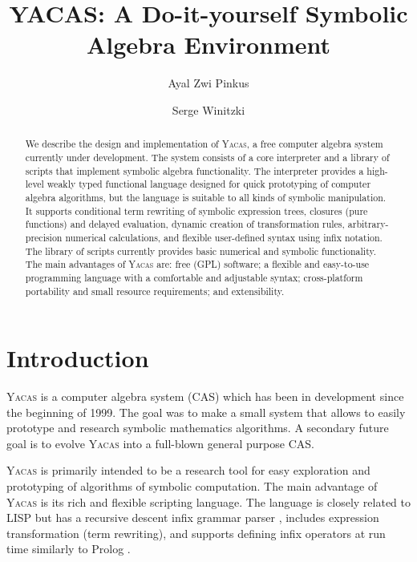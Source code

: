 \documentclass{llncs}
\begin{document}
\title{YACAS: A Do-it-yourself Symbolic Algebra Environment}

\author{Ayal Zwi Pinkus \and Serge Winitzki}

\maketitle

\begin{abstract}
We describe the design and implementation of \textsc{Yacas}, a free computer
algebra system currently under development.  The system consists of a core
interpreter and a library of scripts that implement symbolic algebra
functionality.  The interpreter provides a high-level weakly typed functional
language designed for quick prototyping of computer algebra algorithms, but the
language is suitable to all kinds of symbolic manipulation. It supports
conditional term rewriting of symbolic expression trees, closures (pure
functions) and delayed evaluation, dynamic creation of transformation rules,
arbitrary-precision numerical calculations, and flexible user-defined syntax
using infix notation.  The library of scripts currently provides basic
numerical and symbolic functionality. The main advantages of \textsc{Yacas} are: free (GPL)
software; a
flexible and easy-to-use programming language with a comfortable and adjustable
syntax; cross-platform portability and small resource requirements; and extensibility.
\end{abstract}



\section{Introduction}
\textsc{Yacas} is a computer algebra system (CAS) which has been in development since the beginning of 1999.
The goal was to make a small system that allows to easily prototype and
research symbolic mathematics algorithms. A secondary future goal is to evolve
\textsc{Yacas} into a full-blown general purpose CAS.


\textsc{Yacas} is primarily intended to be a research tool for easy
exploration and prototyping of algorithms of symbolic
computation.  The main advantage of \textsc{Yacas} is its rich and flexible
scripting language. The language is closely related to LISP \cite{WH89} but has
a recursive descent infix grammar parser \cite{ASU86}, includes expression
transformation (term rewriting), and supports defining infix operators at run time
similarly to Prolog \cite{B86}.
\end{document}
